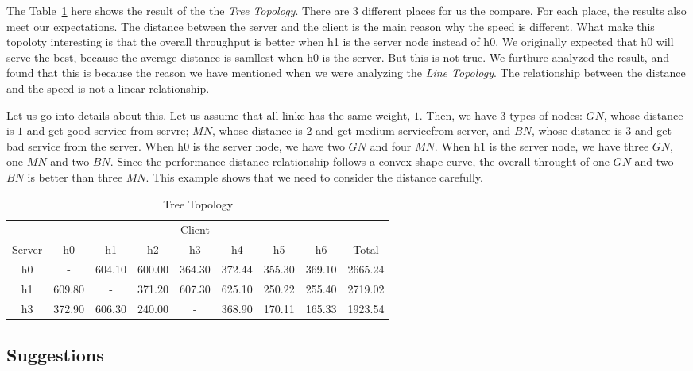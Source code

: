 The Table~\ref{table:tree} here shows the result of the the {\it Tree Topology}. There are 3
different places for us the compare. For each place, the results also meet our expectations.
The distance between the server and the client is the main reason why the speed is different.
What make this topoloty interesting is that the overall throughput is better when h1 is the 
server node instead of h0. We originally expected that h0 will serve the best, because the 
average distance is samllest when h0 is the server. But this is not true. We furthure analyzed
the result, and found that this is because the reason we have mentioned when we were analyzing
the {\it Line Topology}. The relationship between the distance and the speed is not a linear
relationship.

Let us go into details about this. Let us assume that all linke has the same weight, $1$. Then,
we have $3$ types of nodes: $GN$, whose distance is $1$ and get good service from servre; $MN$,
whose distance is $2$ and get medium servicefrom server, and $BN$, whose distance is $3$ and get
bad service from the server. When h0 is the server node, we have two $GN$ and four $MN$. When h1
is the server node, we have three $GN$, one $MN$ and two $BN$. Since the performance-distance 
relationship follows a convex shape curve, the overall throught of one $GN$ and two $BN$ is better
than three $MN$. This example shows that we need to consider the distance carefully.
\begin{table}
	\renewcommand{\arraystretch}{1.3}
	\caption{Tree Topology}
	\label{table:tree}
	\setlength\tabcolsep{4pt}
	\centering
	\begin{tabular}{|c||c|c|c|c|c|c|c||c|}
		\hline
		       & \multicolumn{7}{c||}{Client} &  \\ \hhline{|~||-------||~|}
		Server & h0 & h1 & h2 & h3 & h4 & h5 & h6 & Total\\
\hline\hline
h0 &    -     &  604.10  &  600.00  &  364.30  &  372.44  &  355.30  &  369.10  & 2665.24 \\
\hline
h1 &  609.80  &     -    &  371.20  &  607.30  &  625.10  &  250.22  &  255.40  & 2719.02 \\
\hline
h3 &  372.90  &  606.30  &  240.00  &     -    &  368.90  &  170.11  &  165.33  & 1923.54 \\
\hline
	\end{tabular}
\end{table}

\subsection{Suggestions} \label{subsec:suggestions}

